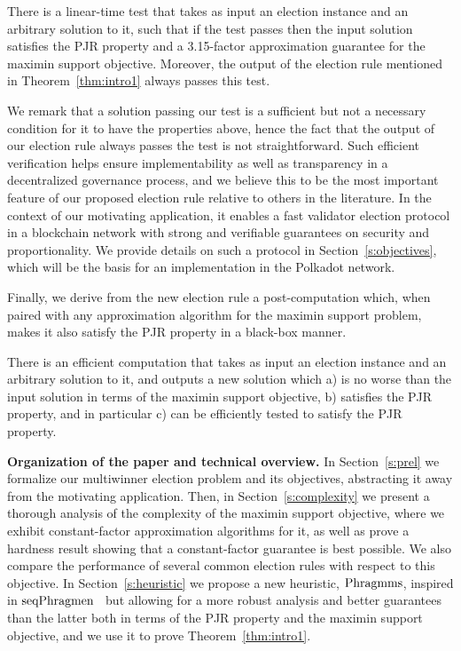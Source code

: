 \begin{theorem}\label{thm:intro2}
There is a linear-time test that takes as input an election instance and an arbitrary solution to it, such that if the test passes then the input solution satisfies the PJR property and a 3.15-factor approximation guarantee for the maximin support objective. 
Moreover, the output of the election rule mentioned in Theorem~\ref{thm:intro1} always passes this test.
\end{theorem}

We remark that a solution passing our test is a sufficient but not a necessary condition for it to have the properties above, hence the fact that the output of our election rule always passes the test is not straightforward.
Such efficient verification helps ensure implementability as well as transparency in a decentralized governance process, and we believe this to be the most important feature of our proposed election rule relative to others in the literature. 
In the context of our motivating application, it enables a fast validator election protocol in a blockchain network with strong and verifiable guarantees on security and proportionality. 
We provide details on such a protocol in Section~\ref{s:objectives}, which will be the basis for an implementation in the Polkadot network.

Finally, we derive from the new election rule a post-computation which, when paired with any approximation algorithm for the maximin support problem, makes it also satisfy the PJR property in a black-box manner.

\begin{theorem}\label{thm:intro3}
There is an efficient computation that takes as input an election instance and an arbitrary solution to it, and outputs a new solution which a) is no worse than the input solution in terms of the maximin support objective, b) satisfies the PJR property, and in particular c) can be efficiently tested to satisfy the PJR property.
\end{theorem}

\textbf{Organization of the paper and technical overview.}
In Section~\ref{s:prel} we formalize our multiwinner election problem and its objectives, abstracting it away from the motivating application. Then, in Section~\ref{s:complexity} we present a thorough analysis of the complexity of the maximin support objective, where we exhibit constant-factor approximation algorithms for it, as well as prove a hardness result showing that a constant-factor guarantee is best possible. We also compare the performance of several common election rules with respect to this objective.
In Section~\ref{s:heuristic} we propose a new heuristic, $\operatorname{Phragmms}$, inspired in $\operatorname{seqPhragmen}$~\cite{brill2017phragmen} but allowing for a more robust analysis and better guarantees than the latter both in terms of the PJR property and the maximin support objective, and we use it to prove Theorem~\ref{thm:intro1}. 

